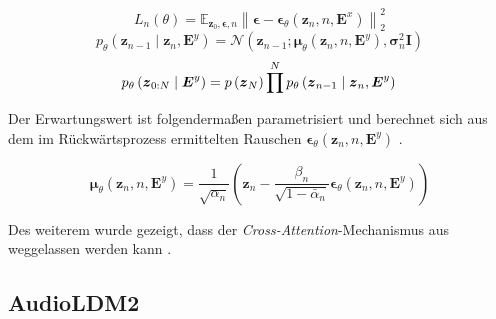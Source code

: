 \documentclass[
  a4paper,  %
  twoside,  %
  bibliography=totoc,
  headsepline,
  cleardoublepage=empty,
  parskip=half,
  draft=false
]{scrbook}
\begin{document}
\begin{equation}
    L_n(\theta)=\mathbb{E}_{\boldsymbol{z}_0, \boldsymbol{\epsilon}, n}\left\|\boldsymbol{\epsilon}-\boldsymbol{\epsilon}_\theta\left(\boldsymbol{z}_n, n, \boldsymbol{E}^x\right)\right\|_2^2
\end{equation}
\begin{equation}
    p_\theta\left(\boldsymbol{z}_{n-1} \mid \boldsymbol{z}_n, \boldsymbol{E}^y\right)=\mathcal{N}\left(\boldsymbol{z}_{n-1} ; \boldsymbol{\mu}_\theta\left(\boldsymbol{z}_n, n, \boldsymbol{E}^y\right), \boldsymbol{\sigma}_n^2 \boldsymbol{I}\right)
\end{equation}
\begin{equation}
    p_\theta\left(\boldsymbol{z}_{0: N} \mid \boldsymbol{E}^y\right)=p\left(\boldsymbol{z}_N\right) \prod^N p_\theta\left(\boldsymbol{z}_{n-1} \mid \boldsymbol{z}_n, \boldsymbol{E}^y\right) \\
\end{equation}

Der Erwartungswert ist folgendermaßen parametrisiert und berechnet sich aus dem im Rückwärtsprozess ermittelten Rauschen $\boldsymbol{\epsilon}_\theta\left(\boldsymbol{z}_n, n, \boldsymbol{E}^y\right)$ \cite{liu_audioldm_2023}.

\begin{equation}
    \boldsymbol{\mu}_\theta\left(\boldsymbol{z}_n, n, \boldsymbol{E}^y\right)=\frac{1}{\sqrt{\alpha_n}}\left(\boldsymbol{z}_n-\frac{\beta_n}{\sqrt{1-\bar{\alpha}_n}} \boldsymbol{\epsilon}_\theta\left(\boldsymbol{z}_n, n, \boldsymbol{E}^y\right)\right)
\end{equation}

Des weiterem wurde gezeigt, dass der \emph{Cross-Attention}-Mechanismus aus \cite{rombach_high-resolution_2022} weggelassen werden kann \cite{liu_audioldm_2023}. 

\subsection{AudioLDM2}
\end{document}
